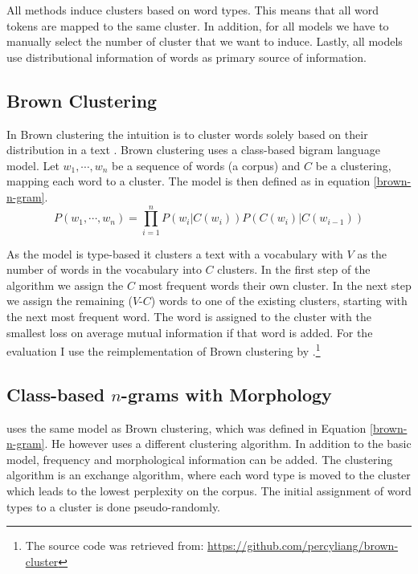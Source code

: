 \documentclass[11pt]{article}
\begin{document}
{All methods induce clusters based on word types. This means that all word tokens are mapped to the same cluster. In addition, for all models we have to manually select the number of cluster that we want to induce. Lastly, all models use distributional information of words as primary source of information.

\subsection{Brown Clustering}
\label{brown_clustering}
In Brown clustering the intuition is to cluster words solely based on their distribution in a text \citep{brown1992class}. Brown clustering uses a class-based bigram language model. Let $w_1,\cdots, w_n$ be a sequence of words (a corpus) and $C$ be a clustering, mapping each word to a cluster. The model is then defined as in equation \ref{brown-n-gram}.
\begin{equation}\label{brown-n-gram}
P(w_1,\cdots,w_n) = \prod_{i=1}^{n}P(w_i|C(w_{i}))P(C(w_{i})|C(w_{i-1}))
\end{equation}

As the model is type-based it clusters a text with a vocabulary with $V$ as the number of words in the vocabulary into $C$ clusters. In the first step of the algorithm we assign the $C$ most frequent words their own cluster. In the next step we assign the remaining ($V$-$C$) words to one of the existing clusters, starting with the next most frequent word. The word is assigned to the cluster with the smallest loss on average mutual information if that word is added.  
For the evaluation I use the reimplementation of Brown clustering by \cite{liang2005semi}.\footnote{The source code was retrieved from: \url{https://github.com/percyliang/brown-cluster}} 

\subsection{Class-based $n$-grams with Morphology}
\label{clark_morph}
\cite{clark2003cda} uses the same model as Brown clustering, which was defined in Equation \ref{brown-n-gram}. He however uses a different clustering algorithm. In addition to the basic model, frequency and morphological information can be added. The clustering algorithm is an exchange algorithm, where each word type is moved to the cluster which leads to the lowest perplexity on the corpus. The initial assignment of word types to a cluster is done pseudo-randomly. 

}
\end{document}
